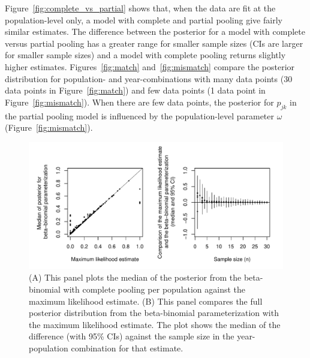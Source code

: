\documentclass[12pt, oneside, titlepage]{article}   	%
\begin{document}
Figure~\ref{fig:complete_vs_partial} shows that, when the data are fit at the population-level only, a model with complete and partial pooling give fairly similar estimates. The difference between the posterior for a model with complete versus partial pooling has a greater range for smaller sample sizes (CIs are larger for smaller sample sizes) and a model with complete pooling returns slightly higher estimates. Figures~\ref{fig:match} and~\ref{fig:mismatch} compare the posterior distribution for population- and year-combinations with many data points (30 data points in Figure~\ref{fig:match}) and few data points (1 data point in Figure~\ref{fig:mismatch}). When there are few data points, the posterior for $p_{jk}$ in the partial pooling model is influenced by the population-level parameter $\omega$ (Figure~\ref{fig:mismatch}).




 \begin{figure}[h]
   \centering
       \includegraphics[page=1,width=.9\textwidth]{../figures/appendix-x-mle_bayes}  
    \caption{ (A) This panel plots the median of the posterior from the beta-binomial with complete pooling per population against the maximum likelihood estimate. (B) This panel compares the full posterior distribution from the beta-binomial parameterization with the maximum likelihood estimate. The plot shows the median of the difference (with 95\% CIs) against the sample size in the year-population combination for that estimate.  }
 \label{fig:mle_bayes}
\end{figure}
\end{document}
